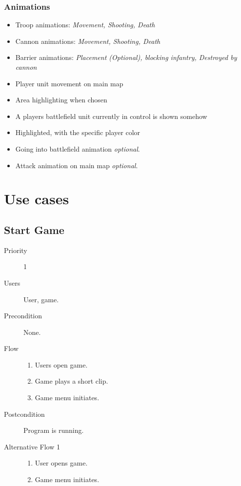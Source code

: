 \documentclass[12pt,a4paper]{article}
\let\stdsection\section
\renewcommand\section{\newpage\stdsection}
\begin{document}
\subsubsection{Animations}

\begin{itemize}
\item Troop animations: \emph{Movement, Shooting, Death}
\item Cannon animations: \emph{Movement, Shooting, Death}
\item Barrier animations: \emph{Placement (Optional), blocking
    infantry, Destroyed by cannon}
\item Player unit movement on main map
\item Area highlighting when chosen
\item A players battlefield unit currently in control is shown somehow
\item Highlighted, with the specific player color
\item Going into battlefield animation \emph{optional}.
\item Attack animation on main map \emph{optional}.
\end{itemize}


\section{Use cases}

\subsection{Start Game}
\begin{description}
\item[Priority] 1
\item[Users] User, game.
\item[Precondition] None.
\item[Flow]\mbox{}
  \begin{enumerate}
  \item Users open game.
  \item Game plays a short clip.
  \item Game menu initiates.
  \end{enumerate}
\item[Postcondition] Program is running.
\item[Alternative Flow 1]\mbox{}
  \begin{enumerate}
  \item User opens game.
  \item Game menu initiates.
  \end{enumerate}
\end{description}
\end{document}
